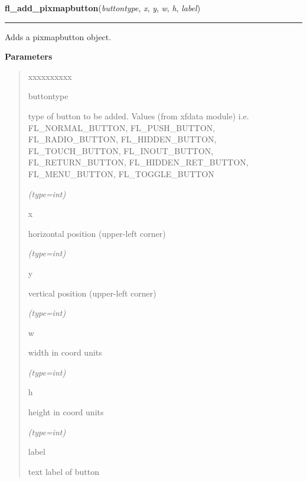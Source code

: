 \hspace{.8\funcindent}\begin{boxedminipage}{\funcwidth}

    \raggedright \textbf{fl\_add\_pixmapbutton}(\textit{buttontype}, \textit{x}, \textit{y}, \textit{w}, \textit{h}, \textit{label})

    \vspace{-1.5ex}

    \rule{\textwidth}{0.5\fboxrule}
\setlength{\parskip}{2ex}
    Adds a pixmapbutton object.

\setlength{\parskip}{1ex}
      \textbf{Parameters}
      \vspace{-1ex}

      \begin{quote}
        \begin{Ventry}{xxxxxxxxxx}

          \item[buttontype]

          type of button to be added. Values (from xfdata module) i.e. 
          FL\_NORMAL\_BUTTON, FL\_PUSH\_BUTTON, FL\_RADIO\_BUTTON, 
          FL\_HIDDEN\_BUTTON, FL\_TOUCH\_BUTTON, FL\_INOUT\_BUTTON, 
          FL\_RETURN\_BUTTON, FL\_HIDDEN\_RET\_BUTTON, FL\_MENU\_BUTTON, 
          FL\_TOGGLE\_BUTTON

            {\it (type=int)}

          \item[x]

          horizontal position (upper-left corner)

            {\it (type=int)}

          \item[y]

          vertical position (upper-left corner)

            {\it (type=int)}

          \item[w]

          width in coord units

            {\it (type=int)}

          \item[h]

          height in coord units

            {\it (type=int)}

          \item[label]

          text label of button


\end{Ventry}
\end{quote}
\end{boxedminipage}
